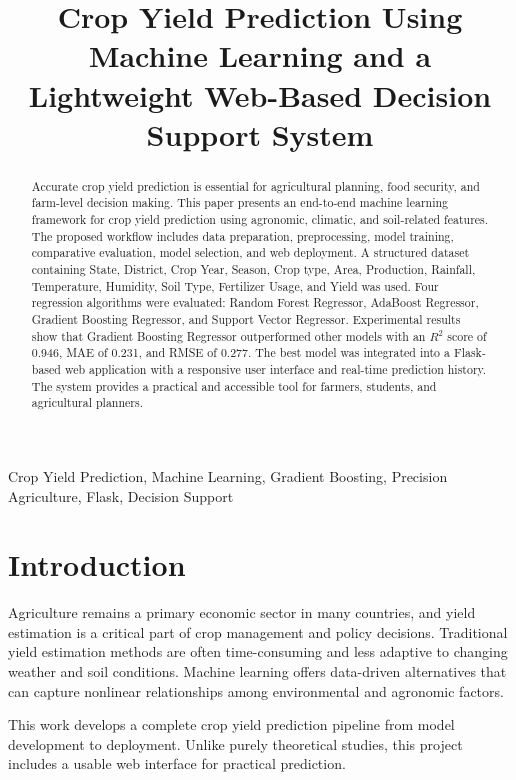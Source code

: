 \documentclass[conference]{IEEEtran}
\title{Crop Yield Prediction Using Machine Learning and a Lightweight Web-Based Decision Support System}
\author{%
\IEEEauthorblockN{Your Name}
\IEEEauthorblockA{Department of Computer Science\\
Your Institution\\
City, Country\\
email@domain.com}
}
\begin{document}
\maketitle

\begin{abstract}
Accurate crop yield prediction is essential for agricultural planning, food security, and farm-level decision making. This paper presents an end-to-end machine learning framework for crop yield prediction using agronomic, climatic, and soil-related features. The proposed workflow includes data preparation, preprocessing, model training, comparative evaluation, model selection, and web deployment. A structured dataset containing State, District, Crop Year, Season, Crop type, Area, Production, Rainfall, Temperature, Humidity, Soil Type, Fertilizer Usage, and Yield was used. Four regression algorithms were evaluated: Random Forest Regressor, AdaBoost Regressor, Gradient Boosting Regressor, and Support Vector Regressor. Experimental results show that Gradient Boosting Regressor outperformed other models with an $R^2$ score of 0.946, MAE of 0.231, and RMSE of 0.277. The best model was integrated into a Flask-based web application with a responsive user interface and real-time prediction history. The system provides a practical and accessible tool for farmers, students, and agricultural planners.
\end{abstract}

\begin{IEEEkeywords}
Crop Yield Prediction, Machine Learning, Gradient Boosting, Precision Agriculture, Flask, Decision Support
\end{IEEEkeywords}

\section{Introduction}
Agriculture remains a primary economic sector in many countries, and yield estimation is a critical part of crop management and policy decisions. Traditional yield estimation methods are often time-consuming and less adaptive to changing weather and soil conditions. Machine learning offers data-driven alternatives that can capture nonlinear relationships among environmental and agronomic factors.

This work develops a complete crop yield prediction pipeline from model development to deployment. Unlike purely theoretical studies, this project includes a usable web interface for practical prediction.
\end{document}
